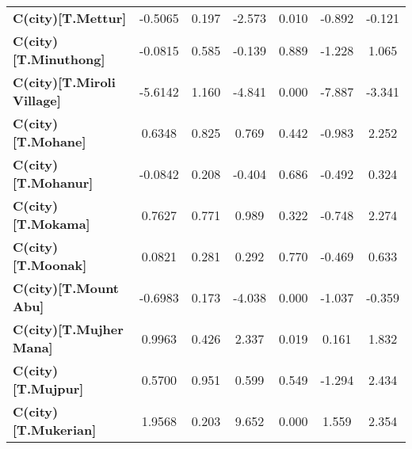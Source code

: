 \begin{center}
\begin{tabular}{lcccccc}
\textbf{C(city)[T.Mettur]}                                                                          &      -0.5065  &        0.197     &    -2.573  &         0.010        &       -0.892    &       -0.121     \\
\textbf{C(city)[T.Minuthong]}                                                                       &      -0.0815  &        0.585     &    -0.139  &         0.889        &       -1.228    &        1.065     \\
\textbf{C(city)[T.Miroli Village]}                                                                  &      -5.6142  &        1.160     &    -4.841  &         0.000        &       -7.887    &       -3.341     \\
\textbf{C(city)[T.Mohane]}                                                                          &       0.6348  &        0.825     &     0.769  &         0.442        &       -0.983    &        2.252     \\
\textbf{C(city)[T.Mohanur]}                                                                         &      -0.0842  &        0.208     &    -0.404  &         0.686        &       -0.492    &        0.324     \\
\textbf{C(city)[T.Mokama]}                                                                          &       0.7627  &        0.771     &     0.989  &         0.322        &       -0.748    &        2.274     \\
\textbf{C(city)[T.Moonak]}                                                                          &       0.0821  &        0.281     &     0.292  &         0.770        &       -0.469    &        0.633     \\
\textbf{C(city)[T.Mount Abu]}                                                                       &      -0.6983  &        0.173     &    -4.038  &         0.000        &       -1.037    &       -0.359     \\
\textbf{C(city)[T.Mujher Mana]}                                                                     &       0.9963  &        0.426     &     2.337  &         0.019        &        0.161    &        1.832     \\
\textbf{C(city)[T.Mujpur]}                                                                          &       0.5700  &        0.951     &     0.599  &         0.549        &       -1.294    &        2.434     \\
\textbf{C(city)[T.Mukerian]}                                                                        &       1.9568  &        0.203     &     9.652  &         0.000        &        1.559    &        2.354     \\

\end{tabular}
\end{center}
